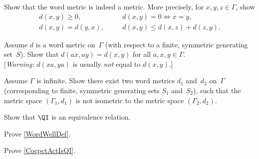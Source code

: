 \begin{exercises}

\item \label{WordMetricEx}
Show that the word metric is indeed a metric. More precisely, for $x,y,z \in \Gamma$, show 
	$$ \begin{matrix}
	d(x,y) \ge 0, 
	&\quad &
	d(x,y) = 0 \iff x = y,
	\\
	d(x,y) = d(y,x),
	&&
	d(x,y) \le d(x,z) + d(z,y)
	. \end{matrix}$$

\item \label{LeftTransIsom}
Assume $d$ is a word metric on~$\Gamma$ (with respect to a finite, symmetric generating set~$S$). Show that $d(a x, a y) = d(x,y)$ for all $a,x,y \in \Gamma$.
\\ {\smaller{}[\emph{Warning:} $d(xa, ya)$ is usually \emph{not} equal to $d(x,y)$.]}

\item \label{WordMetricNotWellDefd}
Assume $\Gamma$ is infinite. Show there exist two word metrics $d_1$ and~$d_2$ on~$\Gamma$ (corresponding to finite, symmetric generating sets $S_1$ and~$S_2$), such that the metric space $(\Gamma_1,d_1)$ is not isometric to the metric space $(\Gamma_2,d_2)$.

\item \label{QIEquivRel}
Show that $\QI$ is an equivalence relation.

\item \label{WordWellDefEx}
Prove \cref{WordWellDef}.


\item \label{CocpctActIsQIEx}
Prove \cref{CocpctActIsQI}.

\end{exercises}




